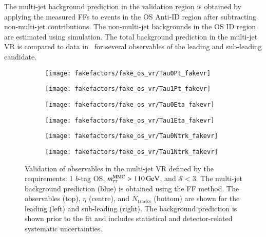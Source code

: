 The multi-jet background prediction in the validation region is obtained by
applying the measured FFs to events in the OS Anti-ID region after subtracting
non-multi-jet contributions. The non-multi-jet backgrounds in the OS ID region
are estimated using simulation. The total background prediction in the multi-jet
VR is compared to data in~ for several
observables of the leading and sub-leading \tauhadvis candidate.

\begin{figure}[htbp]
  \centering

  \begin{subfigure}{0.45\textwidth}
    \texttt{[image: fakefactors/fake\_os\_vr/Tau0Pt\_fakevr]}
  \end{subfigure}\hspace*{0.04\textwidth}%
  \begin{subfigure}{0.45\textwidth}
    \texttt{[image: fakefactors/fake\_os\_vr/Tau1Pt\_fakevr]}
  \end{subfigure}

  \begin{subfigure}{0.45\textwidth}
    \texttt{[image: fakefactors/fake\_os\_vr/Tau0Eta\_fakevr]}
  \end{subfigure}\hspace*{0.04\textwidth}%
  \begin{subfigure}{0.45\textwidth}
    \texttt{[image: fakefactors/fake\_os\_vr/Tau1Eta\_fakevr]}
  \end{subfigure}

  \begin{subfigure}{0.45\textwidth}
    \texttt{[image: fakefactors/fake\_os\_vr/Tau0Ntrk\_fakevr]}
  \end{subfigure}\hspace*{0.04\textwidth}%
  \begin{subfigure}{0.45\textwidth}
    \texttt{[image: fakefactors/fake\_os\_vr/Tau1Ntrk\_fakevr]}
  \end{subfigure}

  \caption{Validation of \tauhadvis observables in the multi-jet VR defined by
    the requirements: 1 $b$-tag OS, $m_{\tau\tau}^\text{MMC} > \SI{110}{\ensuremath{\text{GeV}}}$, and
    $\mathcal{S} < 3$. The multi-jet background prediction (blue) is obtained
    using the FF method. The \tauhadvis observables \pT (top), $\eta$ (centre),
    and $N_{\text{tracks}}$ (bottom) are shown for the leading (left) and
    sub-leading \tauhadvis (right). The background prediction is shown prior to
    the fit and includes statistical and detector-related systematic
    uncertainties.}%
  \label{fig:fake_factor_OSVR_kinematics}%
\end{figure}

